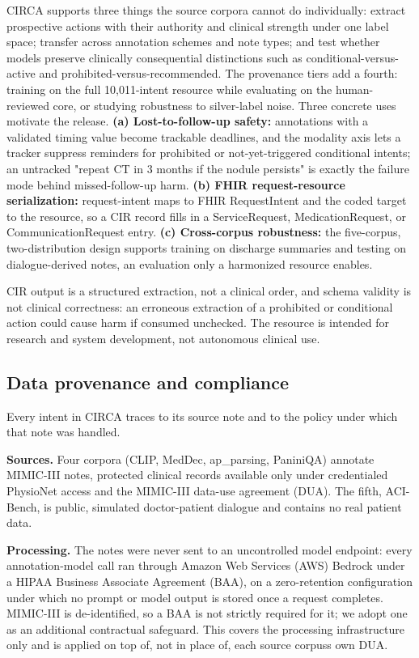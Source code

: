 CIRCA supports three things the source corpora cannot do individually: extract prospective actions with their authority and clinical strength under one label space; transfer across annotation schemes and note types; and test whether models preserve clinically consequential distinctions such as conditional-versus-active and prohibited-versus-recommended. The provenance tiers add a fourth: training on the full 10,011-intent resource while evaluating on the human-reviewed core, or studying robustness to silver-label noise. Three concrete uses motivate the release. \textbf{(a) Lost-to-follow-up safety:} annotations with a validated timing value become trackable deadlines, and the modality axis lets a tracker suppress reminders for prohibited or not-yet-triggered conditional intents; an untracked "repeat CT in 3 months if the nodule persists" is exactly the failure mode behind missed-follow-up harm. \textbf{(b) FHIR request-resource serialization:} request-intent maps to FHIR RequestIntent and the coded target to the resource, so a CIR record fills in a ServiceRequest, MedicationRequest, or CommunicationRequest entry. \textbf{(c) Cross-corpus robustness:} the five-corpus, two-distribution design supports training on discharge summaries and testing on dialogue-derived notes, an evaluation only a harmonized resource enables.

CIR output is a structured extraction, not a clinical order, and schema validity is not clinical correctness: an erroneous extraction of a prohibited or conditional action could cause harm if consumed unchecked. The resource is intended for research and system development, not autonomous clinical use.

\subsection{Data provenance and compliance}\label{data-provenance-and-compliance}

Every intent in CIRCA traces to its source note and to the policy under which that note was handled.

\textbf{Sources.} Four corpora (CLIP, MedDec, ap\_parsing, PaniniQA) annotate MIMIC-III notes, protected clinical records available only under credentialed PhysioNet access and the MIMIC-III data-use agreement (DUA). The fifth, ACI-Bench, is public, simulated doctor-patient dialogue and contains no real patient data.

\textbf{Processing.} The notes were never sent to an uncontrolled model endpoint: every annotation-model call ran through Amazon Web Services (AWS) Bedrock under a HIPAA Business Associate Agreement (BAA), on a zero-retention configuration under which no prompt or model output is stored once a request completes. MIMIC-III is de-identified, so a BAA is not strictly required for it; we adopt one as an additional contractual safeguard. This covers the processing infrastructure only and is applied on top of, not in place of, each source corpus\textquotesingle s own DUA.

